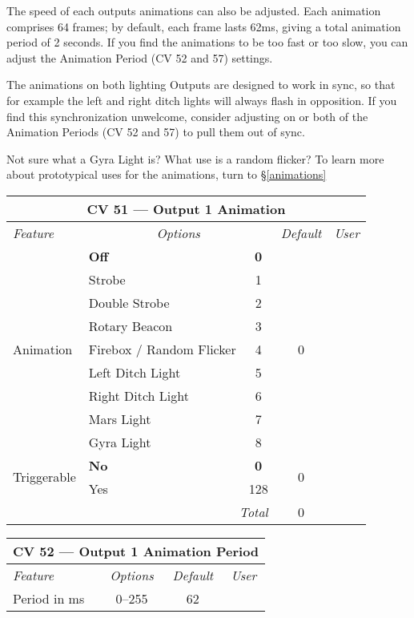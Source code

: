 \documentclass[12pt,letterpaper,draft]{memoir} %
\begin{document}
The speed of each outputs animations can also be adjusted. Each animation comprises 64 frames; by default, each frame lasts 62ms, giving a total animation period of 2 seconds. If you find the animations to be too fast or too slow, you can adjust the Animation Period (CV 52 and 57) settings.

The animations on both lighting Outputs are designed to work in sync, so that for example the left and right ditch lights will always flash in opposition. If you find this synchronization unwelcome, consider adjusting on or both of the Animation Periods (CV 52 and 57) to pull them out of sync.

Not sure what a Gyra Light is? What use is a random flicker? To learn more about prototypical uses for the animations, turn to \S\ref{animations}

\label{CV51}
\begin{center}
\begin{tabular}{|l|lc|c|c|}
\hline
\multicolumn{5}{|c|}{\textbf{CV 51 --- Output 1 Animation}} \\ \hline \hline
\textit{Feature} & \multicolumn{2}{c|}{\textit{Options}} & \textit{Default} & \textit{User} \\ \hline
\multirow{9}{*}{Animation}		& \textbf{Off}		& \textbf{0} 		& \multirow{9}{*}{0} 	&\\
			& Strobe 			& 1 		& 				& \\ 
			& Double Strobe	& 2 		& 				& \\ 
			& Rotary Beacon 	& 3 		& 				& \\ 
			& Firebox / Random Flicker 			& 4 		& 				& \\ 
			& Left Ditch Light 	& 5 		& 				& \\ 
			& Right Ditch Light 	& 6 		& 				& \\
			& Mars Light 		& 7 		& 				& \\
			& Gyra Light 		& 8 		& 				& \\ \hline
\multirow{2}{*}{Triggerable}	& \textbf{No}		& \textbf{0} 		& \multirow{2}{*}{0} 	&\\
			& Yes	 		& 128	& 				& \\ \hline\hline
\multicolumn{3}{|r|}{\textit{Total}} & 0 &\\ \hline
\end{tabular}
\end{center}

\label{CV52}
\begin{center}
\begin{tabular}{|l|c|c|c|}
\hline
\multicolumn{4}{|c|}{\textbf{CV 52 --- Output 1 Animation Period}} \\ \hline \hline
\textit{Feature} & \textit{Options} & \textit{Default} & \textit{User} \\ \hline
Period in ms & 0--255 & 62 &\\ \hline
\end{tabular}
\end{center}
\end{document}
